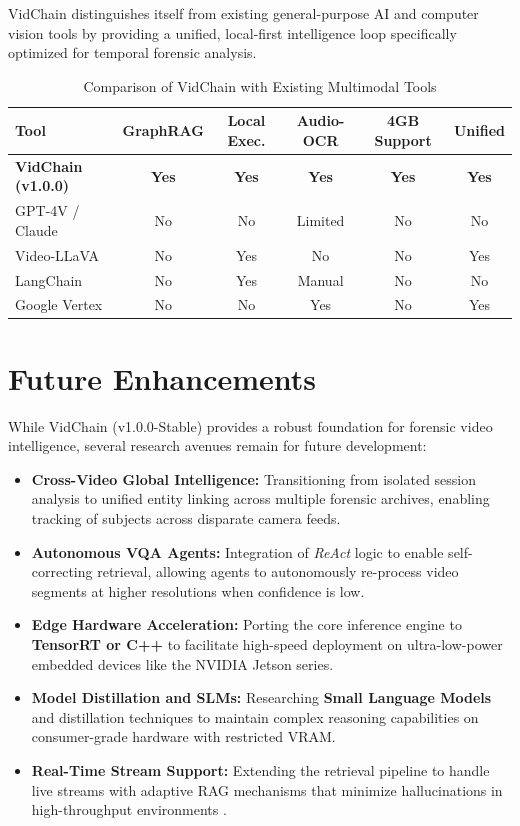 VidChain distinguishes itself from existing general-purpose AI and computer vision tools by providing a unified, local-first intelligence loop specifically optimized for temporal forensic analysis.

\begin{table}[H]
\centering
\scriptsize
\caption{Comparison of VidChain with Existing Multimodal Tools}
\label{tab:comparison}
\begin{tabular}{|p{2.2cm}|c|c|c|c|c|}
\hline
\rowcolor[HTML]{EFEFEF}
\textbf{Tool} & \textbf{GraphRAG} & \textbf{Local Exec.} & \textbf{Audio-OCR} & \textbf{4GB Support} & \textbf{Unified} \\ \hline
\textbf{VidChain (v1.0.0)} & \textbf{Yes} & \textbf{Yes} & \textbf{Yes} & \textbf{Yes} & \textbf{Yes} \\ \hline
GPT-4V / Claude & No & No & Limited & No & No \\ \hline
Video-LLaVA & No & Yes & No & No & Yes \\ \hline
LangChain & No & Yes & Manual & No & No \\ \hline
Google Vertex & No & No & Yes & No & Yes \\ \hline
\end{tabular}
\end{table}

\section{Future Enhancements}

While VidChain (v1.0.0-Stable) provides a robust foundation for forensic video intelligence, several research avenues remain for future development:

\begin{itemize}
    \item \textbf{Cross-Video Global Intelligence:} Transitioning from isolated session analysis to unified entity linking across multiple forensic archives, enabling tracking of subjects across disparate camera feeds.
    \item \textbf{Autonomous VQA Agents:} Integration of \textit{ReAct} logic to enable self-correcting retrieval, allowing agents to autonomously re-process video segments at higher resolutions when confidence is low.
    \item \textbf{Edge Hardware Acceleration:} Porting the core inference engine to \textbf{TensorRT or C++} to facilitate high-speed deployment on ultra-low-power embedded devices like the NVIDIA Jetson series.
    \item \textbf{Model Distillation and SLMs:} Researching \textbf{Small Language Models} and distillation techniques to maintain complex reasoning capabilities on consumer-grade hardware with restricted VRAM.
    \item \textbf{Real-Time Stream Support:} Extending the retrieval pipeline to handle live streams with adaptive RAG mechanisms that minimize hallucinations in high-throughput environments \cite{rag, attention}.
\end{itemize}

